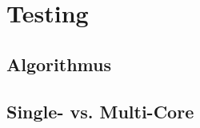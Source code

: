\chapter{Testing}
\label{Testing}

\section{Algorithmus}
\label{Algorithmus}

\section{Single- vs. Multi-Core}
\label{SMCore}